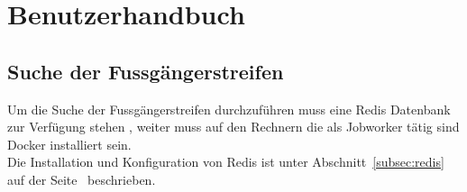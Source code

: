 \section{Benutzerhandbuch}
\subsection{Suche der Fussgängerstreifen}
Um die Suche der Fussgängerstreifen durchzuführen muss eine Redis Datenbank zur Verfügung stehen , weiter muss auf den Rechnern die als Jobworker tätig sind Docker installiert sein. \\
Die Installation und Konfiguration von Redis ist unter Abschnitt~\ref{subsec:redis} auf der Seite~\pageref{subsec:redis} beschrieben.
